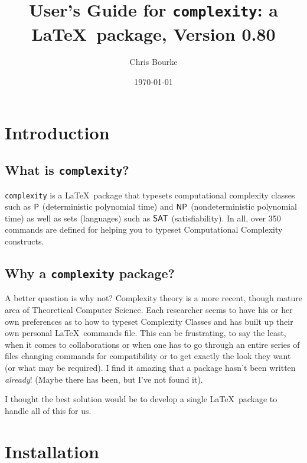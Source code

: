 \documentclass{ltxdoc}
\def\complexityversion{0.80}
\begin{document}
\title{User's Guide for \texttt{complexity}: a \LaTeX\ package, Version \complexityversion}
\author{Chris Bourke\\
}
\date{\today}

\maketitle

\tableofcontents

\section{Introduction}

\subsection{What is \texttt{complexity}?}

\texttt{complexity} is a \LaTeX\ package that typesets computational
complexity classes such as $\P$ (deterministic polynomial time) and
$\NP$ (nondeterministic polynomial time) as well as sets (languages)
such as $\SAT$ (satisfiability).  In all, over 350 commands are
defined for helping you to typeset Computational Complexity
constructs.

\subsection{Why a \texttt{complexity} package?}

A better question is why not?  Complexity theory is a more recent,
though mature area of Theoretical Computer Science.  Each researcher
seems to have his or her own preferences as to how to typeset
Complexity Classes and has built up their own personal \LaTeX\
commands file. This can be frustrating, to say the least, when it
comes to collaborations or when one has to go through an entire
series of files changing commands for compatibility or to get
exactly the look they want (or what may be required).  I find it
amazing that a package hasn't been written \emph{already}!  (Maybe
there has been, but I've not found it).

I thought the best solution would be to develop a single \LaTeX\
package to handle all of this for us.

\section{Installation}
\end{document}
